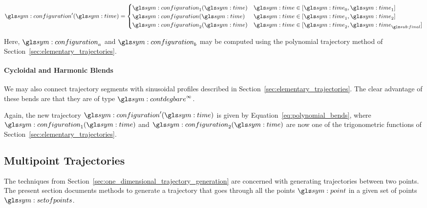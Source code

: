 				\begin{equation}
					\configuration'(\timesym) =
					\begin{cases}
						\configuration_1(\timesym) & \timesym \in [\timesym_0, \timesym_1] \\
						\configuration(\timesym) & \timesym \in [\timesym_1, \timesym_2] \\
						\configuration_2(\timesym) & \timesym \in [\timesym_2, \timesym_{\final}] \\
					\end{cases}
					\label{eq:polynomial_bends}
				\end{equation}

				Here, $\configuration_a$ and $\configuration_b$ may be computed
				using the polynomial trajectory method of
				Section~\ref{sec:elementary_trajectories}.



			\paragraph{Cycloidal and Harmonic Blends}%
			\label{cycloidal_and_harmonic_blends}

				We may also connect trajectory segments with sinusoidal
				profiles described in Section~\ref{sec:elementary_trajectories}.
				The clear advantage of these bends are that they are of type
				$\contdeg{\infty}$.

				Again, the new trajectory $\configuration'(\timesym)$ is given
				by Equation~\ref{eq:polynomial_bends}, where
				$\configuration_1(\timesym)$ and $\configuration_2(\timesym)$
				are now one of the trigonometric functions of
				Section~\ref{sec:elementary_trajectories}.

	\subsection{Multipoint Trajectories}%
	\label{sec:multipoint_trajectories}

		The techniques from
		Section~\ref{sec:one_dimensional_trajectory_generation} are concerned
		with generating trajectories between two points. The present section
		documents methods to generate a trajectory that goes through all the
		points $\point$ in a given set of points $\setofpoints$.

